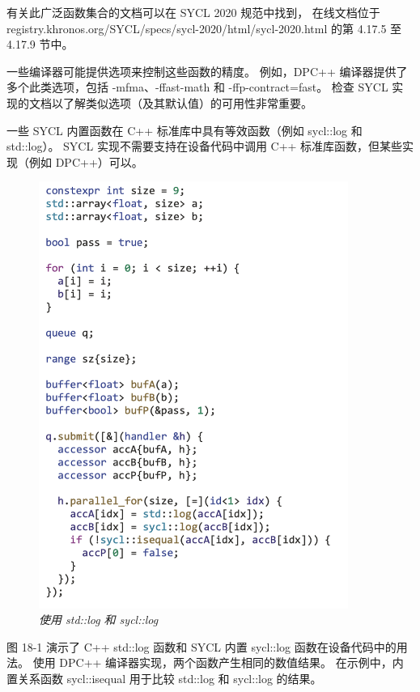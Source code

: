 有关此广泛函数集合的文档可以在 SYCL 2020 规范中找到，
在线文档位于registry.khronos.org/SYCL/specs/sycl-2020/html/sycl-2020.html 的第 4.17.5 至 4.17.9 节中。

一些编译器可能提供选项来控制这些函数的精度。 
例如，DPC++ 编译器提供了多个此类选项，包括 -mfma、-ffast-math 和 -ffp-contract=fast。 
检查 SYCL 实现的文档以了解类似选项（及其默认值）的可用性非常重要。

一些 SYCL 内置函数在 C++ 标准库中具有等效函数（例如 sycl::log 和 std::log）。 
SYCL 实现不需要支持在设备代码中调用 C++ 标准库函数，但某些实现（例如 DPC++）可以。

\begin{figure}[H]
	\centering
	\includegraphics[width=0.9\textwidth]{figs/F18.1.png}
	\caption{\textit{使用 std::log 和 sycl::log }}
\end{figure}

图 18-1 演示了 C++ std::log 函数和 SYCL 内置 sycl::log 函数在设备代码中的用法。 
使用 DPC++ 编译器实现，两个函数产生相同的数值结果。 
在示例中，内置关系函数 sycl::isequal 用于比较 std::log 和 sycl::log 的结果。

